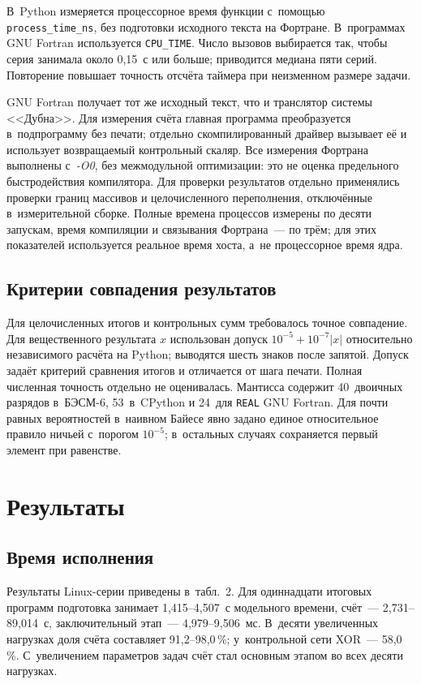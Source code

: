 \documentclass[a4paper,12pt]{article}
\begin{document}
В~Python измеряется процессорное время функции с~помощью \texttt{process\_time\_ns}, без подготовки исходного текста на Фортране. В~программах GNU Fortran используется \texttt{CPU\_TIME}. Число вызовов выбирается так, чтобы серия занимала около 0,15~с или больше; приводится медиана пяти серий. Повторение повышает точность отсчёта таймера при неизменном размере задачи.

GNU Fortran получает тот же исходный текст, что и транслятор системы <<Дубна>>. Для измерения счёта главная программа преобразуется в~подпрограмму без печати; отдельно скомпилированный драйвер вызывает её и использует возвращаемый контрольный скаляр. Все измерения Фортрана выполнены с~\mbox{\textit{-O0}}, без межмодульной оптимизации: это не оценка предельного быстродействия компилятора. Для проверки результатов отдельно применялись проверки границ массивов и целочисленного переполнения, отключённые в~измерительной сборке. Полные времена процессов измерены по десяти запускам, время компиляции и связывания Фортрана~--- по трём; для этих показателей используется реальное время хоста, а~не процессорное время ядра.

\subsection{Критерии совпадения результатов}

Для целочисленных итогов и контрольных сумм требовалось точное совпадение. Для вещественного результата $x$ использован допуск $10^{-5}+10^{-7}|x|$ относительно независимого расчёта на Python; выводятся шесть знаков после запятой. Допуск задаёт критерий сравнения итогов и отличается от шага печати. Полная численная точность отдельно не оценивалась. Мантисса содержит 40~двоичных разрядов в~БЭСМ-6, 53~в~CPython и 24~для \texttt{REAL} GNU Fortran. Для почти равных вероятностей в~наивном Байесе явно задано единое относительное правило ничьей с~порогом $10^{-5}$; в~остальных случаях сохраняется первый элемент при равенстве.

\section{Результаты}

\subsection{Время исполнения}

Результаты Linux-серии приведены в~табл.~2. Для одиннадцати итоговых программ подготовка занимает 1,415--4,507~с модельного времени, счёт~--- 2,731--89,014~с, заключительный этап~--- 4,979--9,506~мс. В~десяти увеличенных нагрузках доля счёта составляет 91,2--98,0\,\%; у~контрольной сети XOR~--- 58,0\,\%. С~увеличением параметров задач счёт стал основным этапом во всех десяти нагрузках.
\end{document}
